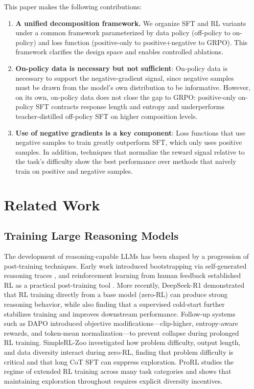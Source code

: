 \documentclass[12pt]{cmuthesis}
\begin{document}
This paper makes the following contributions:
\begin{enumerate}
    \item \textbf{A unified decomposition framework.} We organize SFT and RL variants under a common framework parameterized by data policy (off-policy to on-policy) and loss function (positive-only to positive+negative to GRPO). This framework clarifies the design space and enables controlled ablations.
    \item \textbf{On-policy data is necessary but not sufficient}: On-policy data is necessary to support the negative-gradient signal, since negative samples must be drawn from the model's own distribution to be informative. However, on its own, on-policy data does not close the gap to GRPO: positive-only on-policy SFT contracts response length and entropy and underperforms teacher-distilled off-policy SFT on higher composition levels.
    \item \textbf{Use of negative gradients is a key component}: Loss functions that use negative samples to train greatly outperform SFT, which only uses positive samples. In addition, techniques that normalize the reward signal relative to the task's difficulty show the best performance over methods that naively train on positive and negative samples.
\end{enumerate}


\chapter{Related Work}
\section{Training Large Reasoning Models}

The development of reasoning-capable LLMs has been shaped by a progression of post-training techniques.
Early work introduced bootstrapping via self-generated reasoning traces \citep{zelikmanSTaRBootstrappingReasoning2022}, and reinforcement learning from human feedback established RL as a practical post-training tool \citep{ouyangTrainingLanguageModels2022}.
More recently, DeepSeek-R1 \citep{deepseek-aiDeepSeekR1IncentivizingReasoning2025} demonstrated that RL training directly from a base model (zero-RL) can produce strong reasoning behavior, while also finding that a supervised cold-start further stabilizes training and improves downstream performance.
Follow-up systems such as DAPO \citep{yuDAPOOpenSourceLLM2025} introduced objective modifications---clip-higher, entropy-aware rewards, and token-mean normalization---to prevent collapse during prolonged RL training.
SimpleRL-Zoo \citep{zengSimpleRLZooInvestigatingTaming2025} investigated how problem difficulty, output length, and data diversity interact during zero-RL, finding that problem difficulty is critical and that long CoT SFT can suppress exploration.
ProRL \citep{liuProRLProlongedReinforcement2025} studies the regime of extended RL training across many task categories and shows that maintaining exploration throughout requires explicit diversity incentives.
\end{document}
